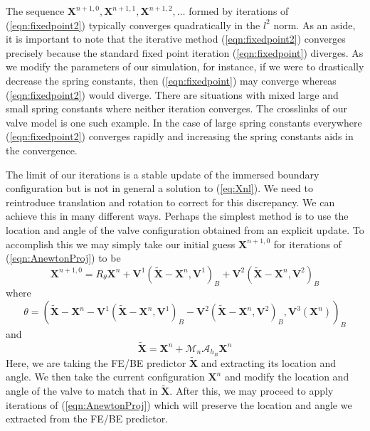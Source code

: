 \documentclass[preprint,12pt]{elsarticle}
\begin{document}
The sequence $\mathbf{X}^{n+1,0}, \mathbf{X}^{n+1,1}, \mathbf{X}^{n+1,2}, \dots$ formed by iterations of (\ref{eqn:fixedpoint2}) typically converges quadratically in the $l^2$ norm.
As an aside, it is important to note that the iterative method (\ref{eqn:fixedpoint2}) converges precisely because the standard fixed point iteration (\ref{eqn:fixedpoint}) diverges. As we modify the parameters of our simulation, for instance,  if we were to drastically decrease the spring constants, then (\ref{eqn:fixedpoint}) may converge whereas (\ref{eqn:fixedpoint2}) would diverge. There are situations with mixed large and small spring constants where neither iteration converges. The crosslinks of our valve model is one such example. In the case of large spring constants everywhere (\ref{eqn:fixedpoint2}) converges rapidly and increasing the spring constants aids in the convergence.

The limit of our iterations is a stable update of the immersed boundary configuration but is not in general a solution to (\ref{eq:Xnl}). We need to reintroduce translation and rotation to correct for this 
discrepancy. We can achieve this in many different ways. Perhaps the simplest method is  to use the location and angle of the valve configuration obtained from an explicit update. To accomplish this we may simply take our initial guess $\mathbf{X}^{n+1,0}$ for iterations of (\ref{eqn:AnewtonProj}) to be
\begin{equation}
\mathbf{X}^{n+1,0} = R_{\theta}\mathbf{X}^n + \mathbf{V}^1(\tilde{\mathbf{X}}-\mathbf{X}^n,\mathbf{V}^1)_B
+ \mathbf{V}^2(\tilde{\mathbf{X}}-\mathbf{X}^n,\mathbf{V}^2)_B
\label{eqn:InitialGuess}
\end{equation}
where
\begin{equation}
\theta = (\tilde{\mathbf{X}}-\mathbf{X}^n
-\mathbf{V}^1(\tilde{\mathbf{X}}-\mathbf{X}^n,\mathbf{V}^1)_B
-\mathbf{V}^2(\tilde{\mathbf{X}}-\mathbf{X}^n,\mathbf{V}^2)_B
,\mathbf{V}^3(\mathbf{X}^n))_B
\end{equation}
and
\begin{equation}
\tilde{\mathbf{X}} = \mathbf{X}^n + \mathcal{M}_n\mathcal{A}_{h_B}\mathbf{X}^n
\end{equation}
Here, we are taking the FE/BE predictor $\tilde{\mathbf{X}}$ and extracting its location and angle. We then take the current configuration $\mathbf{X}^n$ and modify the location and angle of the valve to match that in $\tilde{\mathbf{X}}$. After this, 
 we may proceed to apply iterations of (\ref{eqn:AnewtonProj}) which will preserve the location and angle we extracted from the FE/BE predictor.
\end{document}
